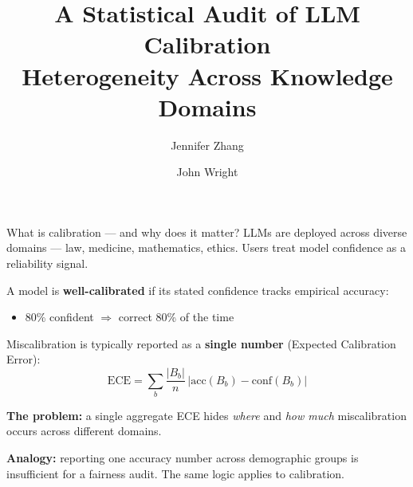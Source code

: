 \documentclass[aspectratio=169,11pt]{beamer}
\title{A Statistical Audit of LLM Calibration\\Heterogeneity Across Knowledge Domains}
\author{Jennifer Zhang \and John Wright}
\institute{STAT 215B, Spring 2026}
\date{}
\begin{document}
\maketitle
\note{}


\begin{frame}{What is calibration — and why does it matter?}
LLMs are deployed across diverse domains --- law, medicine, mathematics, ethics.
Users treat model confidence as a reliability signal.

\vspace{0.5em}
A model is \textbf{well-calibrated} if its stated confidence tracks empirical accuracy:
\begin{itemize}
  \item 80\% confident $\Rightarrow$ correct 80\% of the time
\end{itemize}

\vspace{0.5em}
Miscalibration is typically reported as a \textbf{single number} (Expected Calibration Error):
\[
  \mathrm{ECE} = \sum_b \frac{|B_b|}{n}\,|\text{acc}(B_b) - \text{conf}(B_b)|
\]

\vspace{0.5em}
\textbf{The problem:} a single aggregate ECE hides \emph{where} and \emph{how much}
miscalibration occurs across different domains.

\vspace{0.5em}
\textbf{Analogy:} reporting one accuracy number across demographic groups is
insufficient for a fairness audit. The same logic applies to calibration.
\end{frame}
\end{document}
